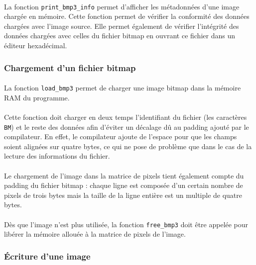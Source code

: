 \documentclass{article}
\begin{document}
    \paragraph{}
    La fonction \texttt{print\_bmp3\_info} permet d'afficher les métadonnées d'une image chargée en mémoire. Cette fonction permet de vérifier la conformité des données chargées avec l'image source. Elle permet également de vérifier l'intégrité des données chargées avec celles du fichier bitmap en ouvrant ce fichier dans un éditeur hexadécimal.


    \subsubsection{Chargement d'un fichier bitmap}
    \paragraph{}
    La fonction \texttt{load\_bmp3} permet de charger une image bitmap dans la mémoire RAM du programme.
    
    \paragraph{}
    Cette fonction doit charger en deux temps l'identifiant du fichier (les caractères \texttt{BM}) et le reste des données afin d'éviter un décalage dû au padding ajouté par le compilateur. En effet, le compilateur ajoute de l'espace pour que les champs soient alignées sur quatre bytes, ce qui ne pose de problème que dans le cas de la lecture des informations du fichier.
    
    \paragraph{}
    Le chargement de l'image dans la matrice de pixels tient également compte du padding du fichier bitmap : chaque ligne est composée d'un certain nombre de pixels de trois bytes mais la taille de la ligne entière est un multiple de quatre bytes.
    
    \paragraph{}
    Dès que l'image n'est plus utilisée, la fonction \texttt{free\_bmp3} doit être appelée pour libérer la mémoire allouée à la matrice de pixels de l'image.



    \subsubsection{Écriture d'une image}
\end{document}
